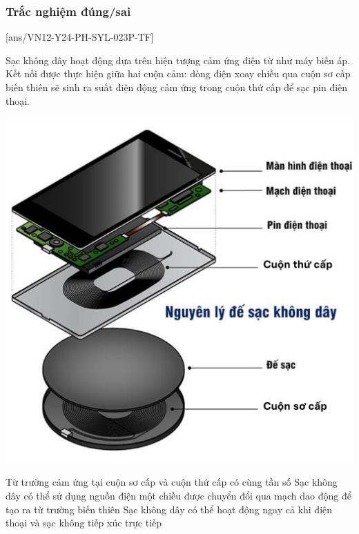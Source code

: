 \subsubsection{Trắc nghiệm đúng/sai}
\setcounter{ex}{0}
[ans/VN12-Y24-PH-SYL-023P-TF]
\begin{ex}
	Sạc không dây hoạt động dựa trên hiện tượng cảm ứng điện từ như máy biến áp. Kết nối được thực hiện giữa hai cuộn cảm: dòng điện xoay chiều qua cuộn sơ cấp biến thiên sẽ sinh ra suất điện động cảm ứng trong cuộn thứ cấp để sạc pin điện thoại.
	\begin{center}
		\includegraphics[width=0.4\linewidth]{figs/VN12-Y24-PH-SYL-024P-3}
		\label{fig: 24P-3}
	\end{center}
	{\True Từ trường cảm ứng tại cuộn sơ cấp và cuộn thứ cấp có cùng tần số}
	{\True Sạc không dây có thể sử dụng nguồn điện một chiều được chuyển đổi qua mạch dao động để tạo ra từ trường biến thiên}
	{\True Sạc không dây có thể hoạt động ngay cả khi điện thoại và sạc không tiếp xúc trực tiếp}
\end{ex}

